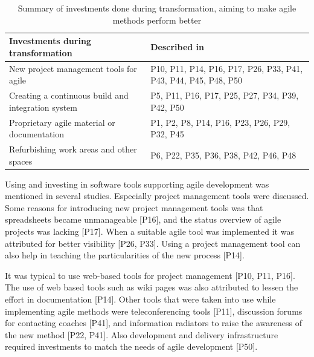 \begin{table}[h]
    \centering
    \begin{tabular}{ >{\raggedright\arraybackslash}p{}
                     >{\raggedright\arraybackslash}p{} }
        \toprule
        Investments during transformation      &  Described in  \\
        \midrule
        New project management tools for agile  &
                P10, P11, P14, P16, P17, P26, P33,
                P41, P43, P44, P45, P48, P50 \\
        Creating a continuous build and integration system  &
                P5, P11, P16, P17, P25, P27, P34, P39, P42, P50 \\
        Proprietary agile material or documentation   & 
                P1, P2, P8, P14, P16, P23, P26, P29, P32, P45  \\
        Refurbishing work areas and other spaces   &
                P6, P22, P35, P36, P38, P42, P46, P48 \\
        \bottomrule
    \end{tabular}
    \caption{Summary of investments done during transformation, aiming to make
             agile methods perform better}
    \label{table:transformation_investments}
\end{table}


Using and investing in software tools supporting agile development was mentioned
in several studies. Especially project management tools were discussed.
Some reasons for introducing new project management tools was that spreadsheets
became unmanageable [P16], and the status overview of agile projects was lacking
[P17]. When a suitable agile tool was implemented it was attributed for better
visibility [P26, P33]. Using a project management tool can also help in teaching
the particularities of the new process [P14].

It was typical to use web-based tools for project management [P10, P11, P16].
The use of web based tools such as wiki pages was also attributed to lessen the
effort in documentation [P14]. Other tools that were taken into use while
implementing agile methods were teleconferencing tools [P11], discussion forums
for contacting coaches [P41], and information radiators to raise the awareness
of the new method [P22, P41]. Also development and delivery infrastructure
required investments to match the needs of agile development [P50]. 

